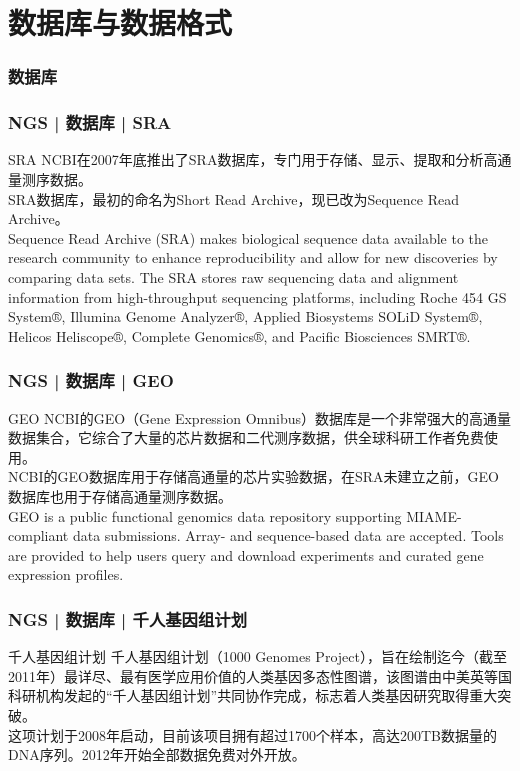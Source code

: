 \section{数据库与数据格式}

\subsubsection{数据库}
\begin{frame}
  \frametitle{NGS | 数据库 | SRA}
  \begin{block}{SRA}
NCBI在2007年底推出了SRA数据库，专门用于存储、显示、提取和分析高通量测序数据。\\
\vspace{1em}
SRA数据库，最初的命名为Short Read Archive，现已改为Sequence Read Archive。\\
\vspace{1em}
Sequence Read Archive (SRA) makes biological sequence data available to the research community to enhance reproducibility and allow for new discoveries by comparing data sets. The SRA stores raw sequencing data and alignment information from high-throughput sequencing platforms, including Roche 454 GS System®, Illumina Genome Analyzer®, Applied Biosystems SOLiD System®, Helicos Heliscope®, Complete Genomics®, and Pacific Biosciences SMRT®.
  \end{block}
\end{frame}

\begin{frame}
  \frametitle{NGS | 数据库 | GEO}
  \begin{block}{GEO}
NCBI的GEO（Gene Expression Omnibus）数据库是一个非常强大的高通量数据集合，它综合了大量的芯片数据和二代测序数据，供全球科研工作者免费使用。\\
\vspace{1em}
NCBI的GEO数据库用于存储高通量的芯片实验数据，在SRA未建立之前，GEO数据库也用于存储高通量测序数据。\\
\vspace{1em}
GEO is a public functional genomics data repository supporting MIAME-compliant data submissions. Array- and sequence-based data are accepted. Tools are provided to help users query and download experiments and curated gene expression profiles.
  \end{block}
\end{frame}

\begin{frame}
  \frametitle{NGS | 数据库 | 千人基因组计划}
  \begin{block}{千人基因组计划}
千人基因组计划（1000 Genomes Project），旨在绘制迄今（截至2011年）最详尽、最有医学应用价值的人类基因多态性图谱，该图谱由中美英等国科研机构发起的“千人基因组计划”共同协作完成，标志着人类基因研究取得重大突破。\\
\vspace{1em}
这项计划于2008年启动，目前该项目拥有超过1700个样本，高达200TB数据量的DNA序列。2012年开始全部数据免费对外开放。
  \end{block}
\end{frame}

